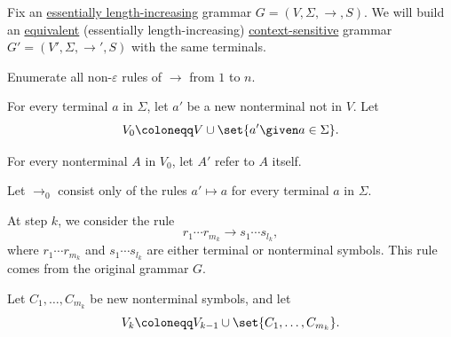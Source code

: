 \begin{algorithm}\label{alg:length_increasing_to_context_sensitive}
  Fix an \hyperref[def:length_increasing_grammar]{essentially length-increasing} grammar \( G = (V, \Sigma, \to, S) \). We will build an \hyperref[def:formal_grammar/equivalent]{equivalent} (essentially length-increasing) \hyperref[def:chomsky_hierarchy/context_sensitive]{context-sensitive} grammar \( G' = (V', \Sigma, \to', S) \) with the same terminals.

  Enumerate all non-\( \varepsilon \) rules of \( \to \) from \( 1 \) to \( n \).

  \begin{thmenum}
     For every terminal \( a \) in \( \Sigma \), let \( a' \) be a new nonterminal not in \( V \). Let
    \begin{equation*}
      V_0 \coloneqq V \cup \set{ a' \given a \in \Sigma }.
    \end{equation*}

    For every nonterminal \( A \) in \( V_0 \), let \( A' \) refer to \( A \) itself.

    Let \( {\to_0} \) consist only of the rules \( a' \mapsto a \) for every terminal \( a \) in \( \Sigma \).

     At step \( k \), we consider the rule
    \begin{equation*}
      r_1 \cdots r_{m_k} \to s_1 \cdots s_{l_k},
    \end{equation*}
    where \( r_1 \cdots r_{m_k} \) and \( s_1 \cdots s_{l_k} \) are either terminal or nonterminal symbols. This rule comes from the original grammar \( G \).

    Let \( C_1, \ldots, C_{m_k} \) be new nonterminal symbols, and let
    \begin{equation*}
      V_k \coloneqq V_{k-1} \cup \set{ C_1, \ldots, C_{m_k} }.
    \end{equation*}


\end{thmenum}
\end{algorithm}
